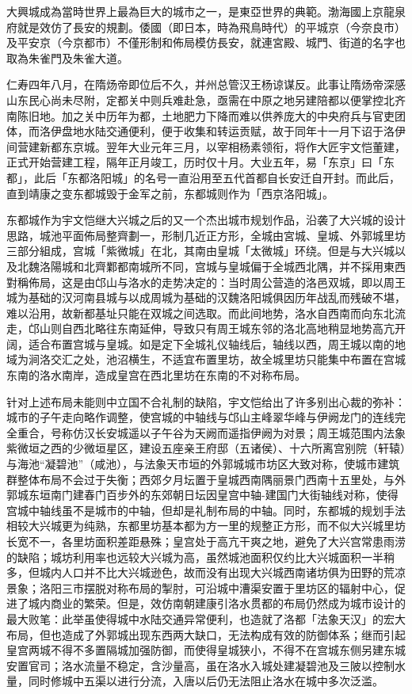 大興城成為當時世界上最為巨大的城市之一，是東亞世界的典範。渤海國上京龍泉府就是效仿了長安的規劃。倭國（即日本，時為飛鳥時代）的平城京（今奈良市）及平安京（今京都市）不僅形制和佈局模仿長安，就連宮殿、城門、街道的名字也取為朱雀門及朱雀大道。

仁寿四年八月，在隋炀帝即位后不久，并州总管汉王杨谅谋反。此事让隋炀帝深感山东民心尚未尽附，定都关中则兵难赴急，亟需在中原之地另建陪都以便掌控北齐南陈旧地。加之关中历年为都，土地肥力下降而难以供养庞大的中央府兵与官吏团体，而洛伊盘地水陆交通便利，便于收集和转运贡赋，故于同年十一月下诏于洛伊间营建新都东京城。翌年大业元年三月，以宰相杨素领衔，将作大匠宇文恺董建，正式开始营建工程，隔年正月竣工，历时仅十月。大业五年，易「东京」曰「东都」，此后「东都洛阳城」的名号一直沿用至五代首都自长安迁自开封。而此后，直到靖康之变东都城毁于金军之前，东都城则作为「西京洛阳城」。

东都城作为宇文恺继大兴城之后的又一个杰出城市规划作品，沿袭了大兴城的设计思路，城池平面佈局整齊劃一，形制几近正方形，全城由宮城、皇城、外郭城里坊三部分組成，宫城「紫微城」在北，其南由皇城「太微城」环绕。但是与大兴城以及北魏洛陽城和北齊鄴都南城所不同，宫城与皇城偏于全城西北隅，并不採用東西對稱佈局，这是由邙山与洛水的走势决定的：当时周公营造的洛邑双城，即以周王城为基础的汉河南县城与以成周城为基础的汉魏洛阳城俱因历年战乱而残破不堪，难以沿用，故新都基址只能在双城之间选取。而此间地势，洛水自西南而向东北流走，邙山则自西北略往东南延伸，导致只有周王城东邻的洛北高地稍显地势高亢开阔，适合布置宫城与皇城。如是定下全城礼仪轴线后，轴线以西，周王城以南的地域为涧洛交汇之处，池沼横生，不适宜布置里坊，故全城里坊只能集中布置在宫城东南的洛水南岸，造成皇宫在西北里坊在东南的不对称布局。

针对上述布局未能则中立国不合礼制的缺陷，宇文恺给出了许多别出心裁的弥补：城市的子午走向略作调整，使宫城的中轴线与邙山主峰翠华峰与伊阙龙门的连线完全重合，号称仿汉长安城遥以子午谷为天阙而遥指伊阙为对景；周王城范围内法象紫微垣之西的少微垣星区，建设五座亲王府邸（五诸侯）、十六所离宫别院（轩辕）与海池“凝碧池”（咸池），与法象天市垣的外郭城城市坊区大致对称，使城市建筑群整体布局不会过于失衡；西郊夕月坛置于皇城西南隅丽景门西南十五里处，与外郭城东垣南门建春门百步外的东郊朝日坛因皇宫中轴-建国门大街轴线对称，使得宫城中轴线虽不是城市的中轴，但却是礼制布局的中轴。同时，东都城的规划手法相较大兴城更为纯熟，东都里坊基本都为方一里的规整正方形，而不似大兴城里坊长宽不一，各里坊面积差距悬殊；皇宫处于高亢干爽之地，避免了大兴宫常患雨涝的缺陷；城坊利用率也远较大兴城为高，虽然城池面积仅约比大兴城面积一半稍多，但城内人口并不比大兴城逊色，故而没有出现大兴城西南诸坊俱为田野的荒凉景象；洛阳三市摆脱对称布局的掣肘，可沿城中漕渠安置于里坊区的辐射中心，促进了城内商业的繁荣。但是，效仿南朝建康引洛水贯都的布局仍然成为城市设计的最大败笔：此举虽使得城中水陆交通异常便利，也造就了洛都「法象天汉」的宏大布局，但也造成了外郭城出现东西两大缺口，无法构成有效的防御体系；继而引起皇宫两城不得不多置隔城加强防御，而使得皇城狭小，不得不在宫城东侧另建东城安置官司；洛水流量不稳定，含沙量高，虽在洛水入城处建凝碧池及三陂以控制水量，同时修城中五渠以进行分流，入唐以后仍无法阻止洛水在城中多次泛滥。

